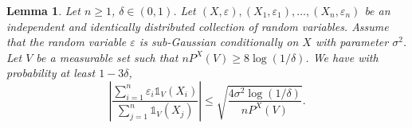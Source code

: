 \documentclass[paper=a4, fontsize=11pt]{scrartcl}
\newcommand{\diam}{\operatorname{diam}}
\newcommand{\argmin}{\operatornamewithlimits{\arg\min}}
\newcommand{\ind}{\mathds{1}}
\newtheorem{lemma}[theorem]{Lemma}
\begin{document}
%
%
%
\begin{lemma} \label{sousgauss}
Let $n\geq 1$, $\delta\in (0,1)$.  Let $(X,\varepsilon), (X_1,\varepsilon_1),\ldots, (X_n, \varepsilon_n)$ be an independent and identically distributed collection of random variables. Assume that the random variable $\varepsilon$ is sub-Gaussian conditionally on $X$ with parameter $\sigma^2$. Let $ V  $ be a measurable set such that $ nP^X(V )  \geq 8 \log(1/\delta) $. We have with probability at least $1-3\delta$,
    $$\left| \dfrac{\sum_{i=1}^n \varepsilon_i \ind _{V }(X_i)}{\sum_{j=1}^n \ind _{V}(X_j)} \right| \leq \sqrt{\dfrac{4\sigma^2 \log(1/\delta)}{n P^X(V)} }.$$  
\end{lemma}
\end{document}
